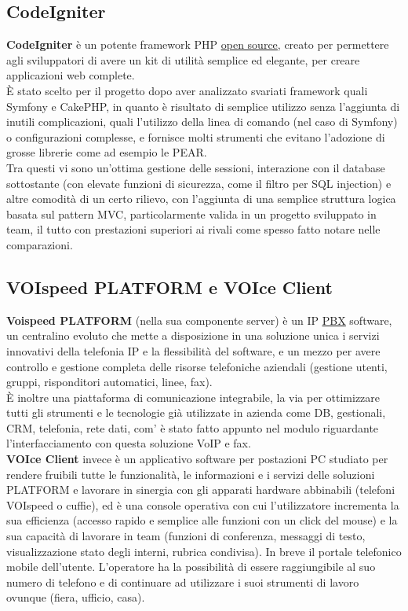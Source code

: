 \subsection{CodeIgniter}
\textbf{CodeIgniter} \` e un potente framework PHP \hyperlink{opensource}{\underline{open source}}, creato per permettere agli sviluppatori di avere un kit di utilit\` a semplice ed elegante, per creare applicazioni web complete. \\
\` E stato scelto per il progetto dopo aver analizzato svariati framework quali Symfony e CakePHP, in quanto \` e risultato di semplice utilizzo senza l'aggiunta di inutili complicazioni, quali l'utilizzo della linea di comando (nel caso di Symfony) o configurazioni complesse, e fornisce molti strumenti \cite{uno} che evitano l'adozione di grosse librerie come ad esempio le PEAR. \\
Tra questi vi sono un'ottima gestione delle sessioni, interazione con il database sottostante (con elevate funzioni di sicurezza, come il filtro per SQL injection) e altre comodit\` a di un certo rilievo, con l'aggiunta di una semplice struttura logica basata sul pattern MVC, particolarmente valida in un progetto sviluppato in team, il tutto con prestazioni superiori ai rivali come spesso fatto notare nelle comparazioni.

\subsection{VOIspeed PLATFORM e VOIce Client}
\textbf{Voispeed PLATFORM} (nella sua componente server) \`e un IP \hyperlink{pbx}{\underline{PBX}} software, un centralino evoluto che mette a disposizione in una soluzione unica i servizi innovativi della telefonia IP e la flessibilit\`a del software, e un mezzo per avere controllo e gestione completa delle risorse telefoniche aziendali (gestione utenti, gruppi, risponditori automatici, linee, fax).\\
\`E inoltre una piattaforma di comunicazione integrabile, la via per ottimizzare tutti gli strumenti e le tecnologie gi\`a utilizzate in azienda come DB, gestionali, CRM, telefonia, rete dati, com' \`e stato fatto appunto nel modulo riguardante l'interfacciamento con questa soluzione VoIP e fax. \\
\textbf{VOIce Client} invece \`e un applicativo software per postazioni PC studiato per rendere fruibili tutte le funzionalit\`a, le informazioni e i servizi delle soluzioni PLATFORM e lavorare in sinergia con gli apparati hardware abbinabili (telefoni VOIspeed o cuffie), ed \`e una console operativa con cui l'utilizzatore incrementa la sua efficienza (accesso rapido e semplice alle funzioni con un click del mouse) e la sua capacit\`a di lavorare in team (funzioni di conferenza, messaggi di testo, visualizzazione stato degli interni, rubrica condivisa). In breve il portale telefonico mobile dell'utente. L'operatore ha la possibilit\`a di essere raggiungibile al suo numero di telefono e di continuare ad utilizzare i suoi strumenti di lavoro ovunque (fiera, ufficio, casa). 


